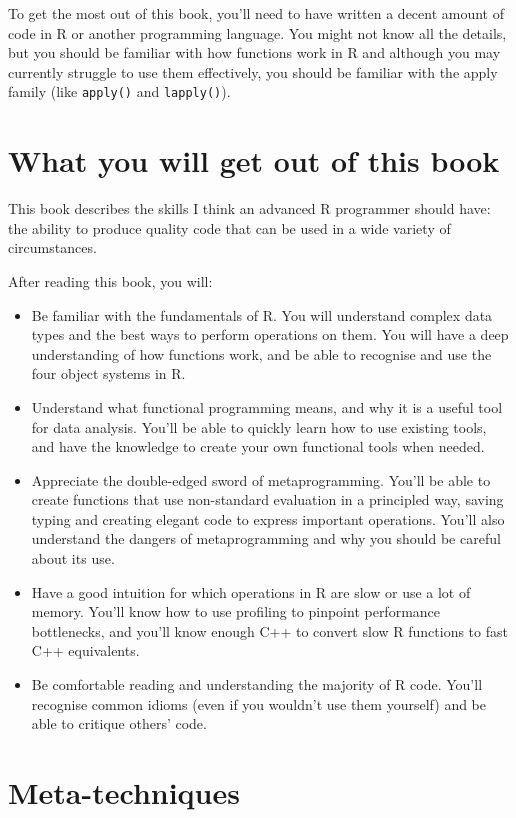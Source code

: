 To get the most out of this book, you'll need to have written a decent
amount of code in R or another programming language. You might not know
all the details, but you should be familiar with how functions work in R
and although you may currently struggle to use them effectively, you
should be familiar with the apply family (like \texttt{apply()} and
\texttt{lapply()}).

\section{What you will get out of this book}

This book describes the skills I think an advanced R programmer should
have: the ability to produce quality code that can be used in a wide
variety of circumstances.

After reading this book, you will:

\begin{itemize}
\item
  Be familiar with the fundamentals of R. You will understand complex
  data types and the best ways to perform operations on them. You will
  have a deep understanding of how functions work, and be able to
  recognise and use the four object systems in R.
\item
  Understand what functional programming means, and why it is a useful
  tool for data analysis. You'll be able to quickly learn how to use
  existing tools, and have the knowledge to create your own functional
  tools when needed.
\item
  Appreciate the double-edged sword of metaprogramming. You'll be able
  to create functions that use non-standard evaluation in a principled
  way, saving typing and creating elegant code to express important
  operations. You'll also understand the dangers of metaprogramming and
  why you should be careful about its use.
\item
  Have a good intuition for which operations in R are slow or use a lot
  of memory. You'll know how to use profiling to pinpoint performance
  bottlenecks, and you'll know enough C++ to convert slow R functions to
  fast C++ equivalents.
\item
  Be comfortable reading and understanding the majority of R code.
  You'll recognise common idioms (even if you wouldn't use them
  yourself) and be able to critique others' code.
\end{itemize}

\section{Meta-techniques}


